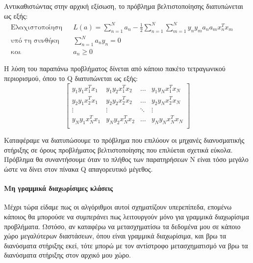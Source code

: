 	Αντικαθιστώντας στην αρχική εξίσωση, το πρόβλημα βελτιστοποίησης διατυπώνεται ως εξής:
	\begin{align}
	\text{Ελαχιστοποίηση} && L(a)= \sum_{n=1}^{N} a_n - \frac{1}{2} \sum_{n=1}^{N} \sum_{m=1}^{N} y_n y_m a_n a_m x_n^T x_m  &&\\
	\text{υπό τη συνθήκη} && \sum_{n=1}^{N} a_n y_n =0 &&\\
	\text{και} && a_n \geq 0  &&
	\end{align}
		
		Η λύση του παραπάνω προβλήματος δίνεται από κάποιο πακέτο τετραγωνικού περιορισμού, όπου το Q διατυπώνεται ως εξής:
		\begin{equation}
		\begin{bmatrix}
		y_1y_1x_1^Tx_1 & y_1y_2x_1^Tx_2   & \dots  &  y_1y_Nx_1^Tx_N \\
		y_2y_1x_2^Tx_1 & y_2y_2x_2^Tx_2   & \dots  &  y_2y_Nx_2^Tx_N \\
		\vdots  & \vdots &\ddots & \vdots \\
		y_Ny_1x_N^Tx_ 1& y_Ny_2x_N^Tx_2   & \dots  &  y_Ny_Nx_N^Tx_N \\
		\end{bmatrix}
		\end{equation}
		
		Καταφέραμε να διατυπώσουμε το πρόβλημα που επιλύουν οι μηχανές διανυσματικής στήριξης σε όρους προβλήματος βελτιστοποίησης που επιλύεται σχετικά εύκολα. Πρόβλημα θα συναντήσουμε όταν το πλήθος των παρατηρήσεων Ν είναι τόσο μεγάλο ώστε να δίνει στον πίνακα Q απαγορευτικό μέγεθος.
		
		
		\paragraph{Μη γραμμικά διαχωρίσιμες κλάσεις}
		Μέχρι τώρα είδαμε πως οι αλγόριθμοι αυτοί σχηματίζουν υπερεπίπεδα, επομένω κάποιος θα μπορούσε να συμπεράνει πως λειτουργούν μόνο για γραμμικά διαχωρίσιμα προβλήματα. Ωστόσο, αν καταφέρω να μετασχηματίσω τα δεδομένα μου σε κάποιο χώρο μεγαλύτερων διαστάσεων, όπου είναι γραμμικά διαχωρίσιμα, και βρω τα διανύσματα στήριξης εκεί, τότε μπορώ με τον αντίστροφο μετασχηματισμό να βρω τα διανύσματα στήριξης στον αρχικό μου χώρο.
		

